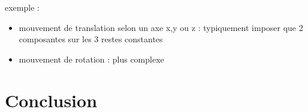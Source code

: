 \documentclass[12pt,a4paper]{article}
\begin{document}
exemple : 
\begin{itemize}
	\item mouvement de translation selon un axe x,y ou z : typiquement imposer que 2 composantes sur les 3 restes constantes
	\item mouvement de rotation : plus complexe
\end{itemize}



\newpage

\section{Conclusion}
\end{document}
